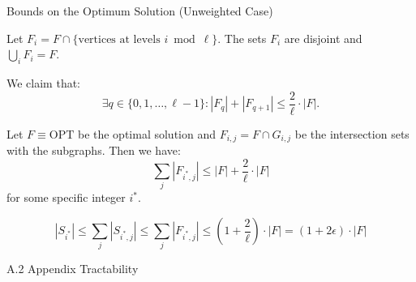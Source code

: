 \documentclass{beamer}
\begin{document}
\begin{frame}{Bounds on the Optimum Solution (Unweighted Case)}
    \footnotesize
    \begin{lemma}
        \label{lemma-two}

        Let $F_i = F \cap \{\text{vertices at levels } i \bmod \ell\}$. 
        The sets $F_i$ are disjoint and $\bigcup_i F_i = F$.

        We claim that:
        \[
            \exists q \in \{0, 1, \dots, \ell-1\} : |F_q| + |F_{q+1}| \leq \frac{2}{\ell} \cdot |F| \text{.}
        \]
    \end{lemma}

    \begin{lemma}
    \label{lemma-three}
    Let \( F \equiv \text{OPT} \) be the optimal solution and \( F_{i,j} = F \cap G_{i,j} \) be the intersection 
    sets with the subgraphs. Then we have: 
    \[
    \sum_j |F_{i^*, j}| \leq |F| + \frac{2}{\ell} \cdot |F|
    \]
    for some specific integer \( i^* \).
    \end{lemma}

    \[
    |S_{i^*}| \leq \sum\limits_{j} |S_{i^*, j}| \leq \sum\limits_{j} |F_{i^*, j}| \leq (1 + \frac{2}{\ell}) \cdot |F| = (1 + 2\epsilon)\cdot\left|F\right|
    \]

\end{frame}

\begin{frame}{A.2}
  \hypertarget{appendix-a2}{}
  \centering
  \Huge Appendix Tractability
\end{frame}
\end{document}
